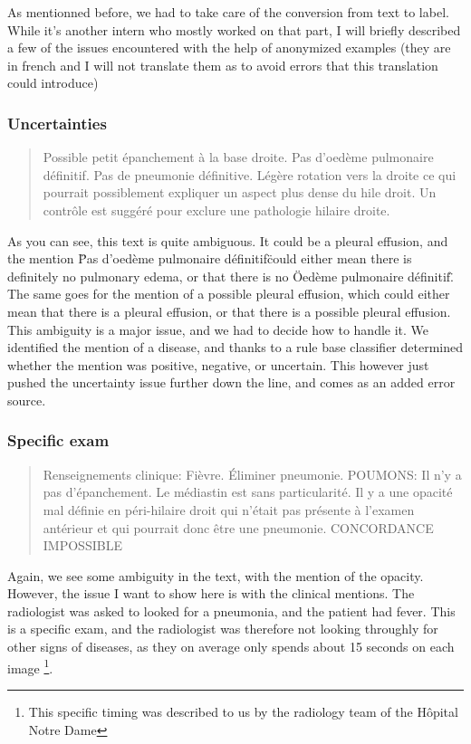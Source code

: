\documentclass[11pt]{article}
\begin{document}
    As mentionned before, we had to take care of the conversion from text to label. While it's another intern who mostly worked on that part, I will
    briefly described a few of the issues encountered with the help of anonymized examples (they are in french and I will not translate them as to avoid errors that this translation could introduce)

    \subsubsection{Uncertainties}

    \begin{quote}
        Possible petit épanchement à la base droite. Pas d'oedème pulmonaire définitif. Pas de pneumonie définitive. Légère rotation vers la droite ce qui pourrait possiblement expliquer un aspect plus dense du hile droit.
        Un contrôle est suggéré pour exclure une pathologie hilaire droite.
    \end{quote}
        As you can see, this text is quite ambiguous. It could be a pleural effusion, and the mention \" Pas d'oedème pulmonaire définitif\"  could either
        mean there is definitely no pulmonary edema, or that there is no \" Oedème pulmonaire définitif\". The same goes for the mention of a possible pleural effusion,
        which could either mean that there is a pleural effusion, or that there is a possible pleural effusion. This ambiguity is a major issue, and we had to decide how to handle it.
        We identified the mention of a disease, and thanks to a rule base classifier determined whether the mention was positive, negative, or uncertain. This however just pushed the uncertainty issue further down
        the line, and comes as an added error source.


    \subsubsection{Specific exam}
        \begin{quote}
            Renseignements clinique: Fièvre. Éliminer pneumonie.
            POUMONS:
            Il n'y a pas d'épanchement. Le médiastin est sans particularité. Il y a une opacité mal définie en péri-hilaire droit qui n'était pas présente à l'examen antérieur et qui pourrait donc être une pneumonie.
            CONCORDANCE IMPOSSIBLE
        \end{quote}

        Again, we see some ambiguity in the text, with the mention of the opacity.  However, the issue I want to show here is with the clinical mentions. The radiologist was asked to looked for a pneumonia, and the patient had fever.
        This is  a specific exam, and the radiologist was therefore not looking throughly for other signs of diseases, as they on average only spends about 15 seconds on each image \footnote{This specific timing was described to us by the radiology team
        of the Hôpital Notre Dame}.
\end{document}
